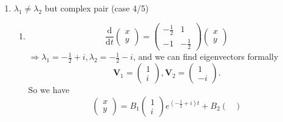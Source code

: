 \documentclass[12pt]{report}
\theoremstyle{definition}
\begin{document}
\begin{ex}
\begin{enumerate}[label = (\roman*)]
                \item $\lambda_1 \neq \lambda_2$ but complex pair (case 4/5)

                    \begin{enumerate}[label = (\alph*)]
                        \item \[
                            \frac{\mathrm{d}}{\mathrm{d}t} \begin{pmatrix}
                                    x \\
                                    y
                            \end{pmatrix} = \begin{pmatrix}
                            -\frac{1}{2} & 1 \\
                            -1 & -\frac{1}{2}
                            \end{pmatrix} \begin{pmatrix}
                                    x \\
                                    y
                            \end{pmatrix} 
                        \]$\Rightarrow{}
                        \lambda_1 = -\frac{1}{2} + i, \lambda_2 = -\frac{1}{2}-i$,
                        and we can find eigenvectors formally \[
                            \pmb{V}_1 = \begin{pmatrix}
                                    1 \\
                                    i
                            \end{pmatrix}, \pmb{V}_2 = \begin{pmatrix}
                                    1 \\
                                    -i
                            \end{pmatrix}.
                        \]So we have\[
                            \begin{pmatrix}
                                    x \\
                                    y
                            \end{pmatrix} = B_1\begin{pmatrix}
                                    1 \\
                                    i
                            \end{pmatrix} e^{(-\frac{1}{2} + i)t} + B_2 \begin{pmatrix}

\end{pmatrix}\]
\end{enumerate}
\end{enumerate}
\end{ex}
\end{document}
